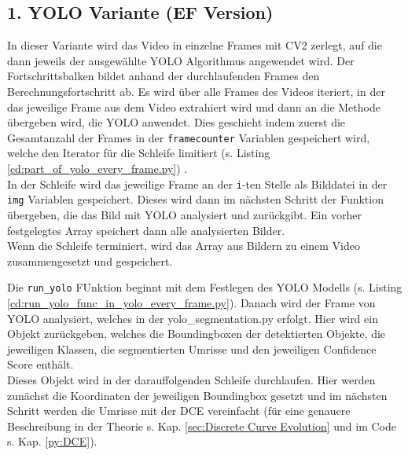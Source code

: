 \subsection{1. YOLO Variante (EF Version)} {
	\label{py:YOLO_every_frame}
	In dieser Variante wird das Video in einzelne Frames mit CV2 zerlegt, auf die dann jeweils der ausgewählte YOLO Algorithmus angewendet wird. Der Fortschrittsbalken bildet anhand der durchlaufenden Frames den Berechnungsfortschritt ab. 
	Es wird über alle Frames des Videos iteriert, in der das jeweilige Frame aus dem Video extrahiert wird und dann an die Methode übergeben wird, die YOLO anwendet. 
	\ifimportant
	\fi	Dies geschieht indem zuerst die Gesamtanzahl der Frames in der \lstinline|framecounter| Variablen gespeichert wird, welche den Iterator für die Schleife limitiert \ifimportant (s. Listing \ref{cd:part_of_yolo_every_frame.py}) \fi . \\ 
	In der Schleife wird das jeweilige Frame an der \lstinline|i|-ten Stelle als Bilddatei in der \lstinline|img| Variablen gespeichert. Dieses wird dann im nächsten Schritt der Funktion übergeben, die das Bild mit YOLO analysiert und zurückgibt. Ein vorher festgelegtes Array speichert dann alle analysierten Bilder. \\ 
	Wenn die Schleife terminiert, wird das Array aus Bildern zu einem Video zusammengesetzt und gespeichert. \\
	\ifimportant
	
	\fi Die \lstinline|run_yolo| FUnktion beginnt mit dem Festlegen des YOLO Modells \ifimportant (s. Listing \ref{cd:run_yolo_func_in_yolo_every_frame.py})\fi. Danach wird der Frame von YOLO analysiert, welches in der yo\-lo\-\_seg\-men\-tat\-ion.py erfolgt. Hier wird ein Objekt zurückgeben, welches die Boundingboxen der detektierten Objekte, die jeweiligen Klassen, die segmentierten Umrisse und den jeweiligen Confidence Score enthält. \\
	Dieses Objekt wird in der darauffolgenden Schleife durchlaufen. Hier werden zunächst die Koordinaten der jeweiligen Boundingbox gesetzt und im nächsten Schritt werden die Umrisse mit der DCE vereinfacht (für eine genauere Beschreibung in der Theorie s. Kap. \ref{sec:Discrete Curve Evolution} und im Code s. Kap. \ref{py:DCE}). 
}
